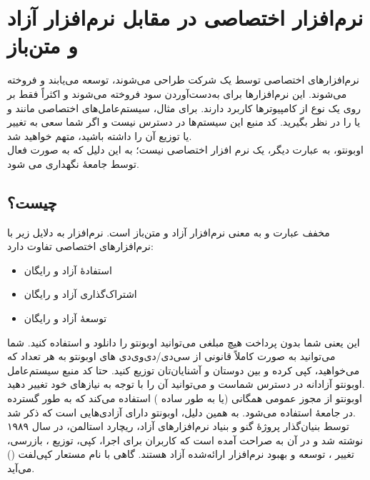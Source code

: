 \section{نرم‌افزار اختصاصی در مقابل نرم‌افزار آزاد و متن‌باز}
نرم‌افزارهای اختصاصی توسط یک شرکت طراحی می‌شوند، توسعه می‌یابند و فروخته می‌شوند. این نرم‌افزارها برای به‌دست‌آوردن سود فروخته می‌شوند و اکثراً فقط بر روی یک نوع از کامپیوترها کاربرد دارند. برای مثال، سیستم‌عامل‌های اختصاصی مانند  و یا  را در نظر بگیرید. کد منبع این سیستم‌ها در دسترس نیست و اگر شما سعی به تغییر یا توزیع آن را داشته باشید، متهم خواهید شد.\\
اوبونتو، به عبارت دیگر، یک نرم افزار اختصاصی نیست؛ به این دلیل که به صورت فعال توسط جامعهٔ  نگهداری می شود.

\subsection
{
چیست؟
}

 مخفف عبارت  و به معنی نرم‌افزار آزاد و متن‌باز است. نرم‌افزار  به دلایل زیر با نرم‌افزارهای اختصاصی تفاوت دارد:

\begin{itemize}
\item استفادهٔ آزاد و رایگان
\item اشتراک‌گذاری آزاد و رایگان
\item توسعهٔ آزاد و رایگان
\end{itemize}

این یعنی شما بدون پرداخت هیچ مبلغی می‌توانید اوبونتو را دانلود و استفاده کنید. شما می‌توانید به صورت کاملاً قانونی از سی‌دی/دی‌وی‌دی های اوبونتو به هر تعداد که می‌خواهید، کپی کرده و بین دوستان و آشنایان‌تان توزیع کنید. حتا کد منبع سیستم‌عامل اوبونتو آزادانه در دسترس شماست و می‌توانید آن را با توجه به نیازهای خود تغییر دهید.\\
اوبونتو از مجوز عمومی همگانی   (یا به طور ساده ) استفاده می‌کند که به طور گسترده در جامعهٔ  استفاده می‌شود. به همین دلیل، اوبونتو دارای آزادی‌هایی است که ذکر شد.\\
 توسط بنیان‌گذار پروژهٔ گنو و بنیاد نرم‌افزارهای آزاد، ریچارد استالمن، در سال ۱۹۸۹ نوشته شد و در آن به صراحت آمده است که کاربران برای اجرا، کپی، توزیع ، بازرسی، تغییر ، توسعه و بهبود نرم‌افزار ارائه‌شده آزاد هستند. گاهی  با  نام مستعار کپی‌لفت () می‌آید.

